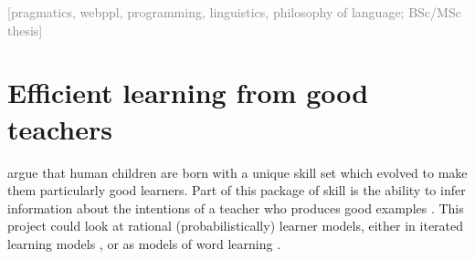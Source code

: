 \documentclass[fleqn,reqno,10pt]{article}
\newcommand{\scope}[1]{\hfill\textcolor{gray}{[#1]}}
\begin{document}
\scope{pragmatics, webppl, programming, linguistics, philosophy of language; BSc/MSc thesis}

\section{Efficient learning from good teachers}

\citet{CsibraGergely2011:Natural-Pedagog} argue that human children are born with a unique
skill set which evolved to make them particularly good learners. Part of this package of skill
is the ability to infer information about the intentions of a teacher who produces good examples
\citep{ShaftoGoodman2014:A-rational-acco}. This project could look at rational
(probabilistically) learner models, either in iterated learning models
\citet{KirbyGriffith2014:Iterated-Learni}, or as models of word learning
\citep{FrankGoodman2014:Inferring-word-}. 

\printbibliography[heading=bibintoc]
\end{document}
